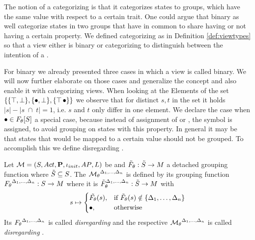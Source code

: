 \documentclass[preview]{standalone}
\begin{document}
The notion of a categorizing \viewN is that it categorizes states to groups, which have the same value with respect to a certain trait. One could argue that binary \viewsN as well categorize states in two groups that have in common to share having or not having a certain property. We defined categorizing \viewsN as in Definition \ref{def:viewtypes} so that a view either is binary or categorizing to distinguish between the intention of a \viewN.

For binary \viewsN we already presented three cases in which a view is called binary. We will now further elaborate on those cases and generalize the concept and also enable it with categorizing views. When looking at the Elements of the set $\{\{{\top}, {\bot}\}, \{{\bullet}, {\bot}\}, \{{\top}\, {\bullet}\}\}$ we observe that for distinct $s,t$ in the set it holds $|s|-|s \; \cap \; t| = 1$, i.e. $s$ and $t$ only differ in one element. We declare the case when ${\bullet} \in {\ensuremath{{F_{{\theta}}}}}[{S}]$ a special case, because instead of assignment of \hasppty or \notppty, the symbol \remelem is assigned, to avoid grouping on states with this property. In general it may be that states that would be mapped to a certain value should not be grouped. To accomplish this we define disregarding \viewsN.

\begin{definition}
	Let ${{{\mathcal{M}}}} = {{({S}, {Act}, {\textbf{P}}, {\iota_{init}}, {AP}, {L})}}$ be \achgphN and ${\tilde{F}_{{\theta}}} : {\tilde{{S}}} \to {\ensuremath{{M}}}$ a detached grouping function where ${\tilde{{S}}} \subseteq {S}$. The \viewN ${{{{\mathcal{M}}}}_{{\theta}}}^{{{\Delta}_1, \dots, {\Delta}_n}}$ is defined by its grouping function ${F_{{\theta}}}^{{{\Delta}_1, \dots, {\Delta}_n}} : {S} \to {\ensuremath{{M}}}$ where it is ${\tilde{F}_{{\theta}}}^{{{\Delta}_1, \dots, {\Delta}_n}} : {\tilde{{S}}} \to {\ensuremath{{M}}}$ with
	\[
	\state \mapsto
	\begin{cases}
		\tilde\grpfct(\state),				& \text{if } \grpfctsub(\state) \notin \{\disregardelements\} \\ 		\remelem,          	& \text{otherwise}
	\end{cases}
	\]
	Its \grpfctN ${F_{{\theta}}}^{{{\Delta}_1, \dots, {\Delta}_n}}$ is called \grpfct \emph{disregarding} \disregardelements and the respective \viewN ${{{{\mathcal{M}}}}_{{\theta}}}^{{{\Delta}_1, \dots, {\Delta}_n}}$ is called \view \emph{disregarding} \disregardelements. 
\end{definition}
\end{document}

